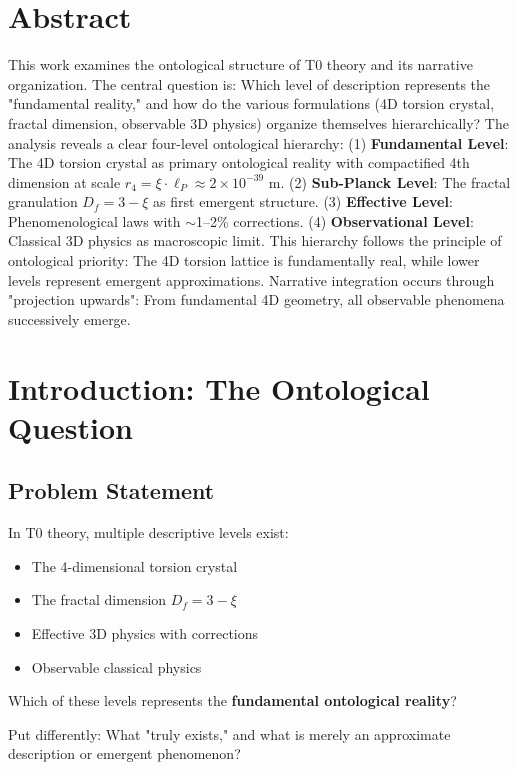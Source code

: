 \section*{Abstract}
		This work examines the ontological structure of T0 theory and its narrative organization. The central question is: Which level of description represents the "fundamental reality," and how do the various formulations (4D torsion crystal, fractal dimension, observable 3D physics) organize themselves hierarchically? The analysis reveals a clear four-level ontological hierarchy: (1) \textbf{Fundamental Level}: The 4D torsion crystal as primary ontological reality with compactified 4th dimension at scale $r_4 = \xi \cdot \ell_P \approx 2 \times 10^{-39}$ m. (2) \textbf{Sub-Planck Level}: The fractal granulation $D_f = 3-\xi$ as first emergent structure. (3) \textbf{Effective Level}: Phenomenological laws with $\sim$1--2\% corrections. (4) \textbf{Observational Level}: Classical 3D physics as macroscopic limit. This hierarchy follows the principle of ontological priority: The 4D torsion lattice is fundamentally real, while lower levels represent emergent approximations. Narrative integration occurs through "projection upwards": From fundamental 4D geometry, all observable phenomena successively emerge.

	
	
	
	\section{Introduction: The Ontological Question}
	
	\subsection{Problem Statement}
	
	In T0 theory, multiple descriptive levels exist:
	\begin{itemize}
		\item The 4-dimensional torsion crystal
		\item The fractal dimension $D_f = 3-\xi$
		\item Effective 3D physics with corrections
		\item Observable classical physics
	\end{itemize}
	
	\begin{important}
		Which of these levels represents the \textbf{fundamental ontological reality}?
		
		Put differently: What "truly exists," and what is merely an approximate description or emergent phenomenon?
	\end{important}
	
